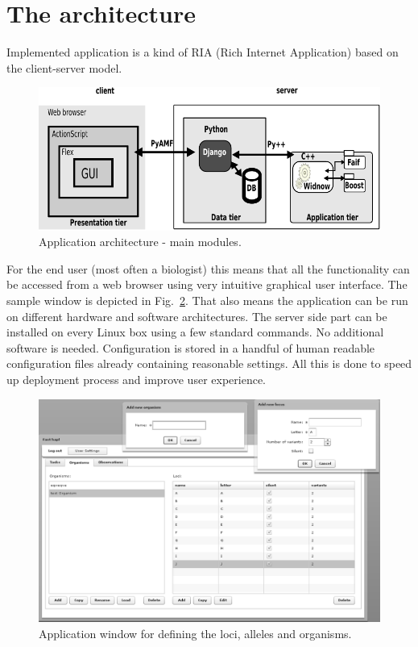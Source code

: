 \documentclass[]{spie}
\begin{document}
\section{The architecture}

Implemented application is a kind of RIA (Rich Internet Application) based on the client-server model.

\begin{figure}[!htb]
\centering
\includegraphics{images/scheme2}
\caption{Application architecture - main modules.}
\label{fig:scheme}
\end{figure}

For the end user (most often a biologist) this means that all the functionality can be accessed from a web browser using very intuitive graphical user interface.
The sample window is depicted in Fig.~\ref{fig:organisms}.
That also means the application can be run on different hardware and software architectures.
The server side part can be installed on every Linux box using a few standard commands.
No additional software is needed.
Configuration is stored in a handful of human readable configuration files already containing reasonable settings.
All this is done to speed up deployment process and improve user experience.

\begin{figure}[!htb]
\centering
\includegraphics[scale=0.4]{images/Organisms}
\caption{Application window for defining the loci, alleles and organisms.}
\label{fig:organisms}
\end{figure}
\end{document}
